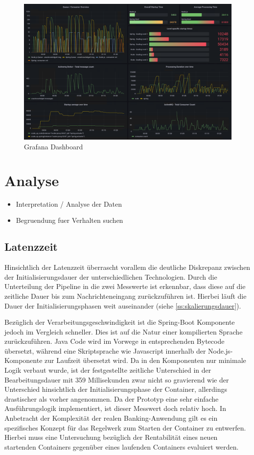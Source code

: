 \begin{figure}[ht!]
	\centering
	\includegraphics[width=\linewidth]{kapitel/problemloesung/implementierung/_img/grafana-dashboard-01}
	\caption[]{Grafana Dashboard}
	\label{fig:grafanaScreenshot01}
\end{figure}


\section{Analyse}
\begin{itemize}
  \item Interpretation / Analyse der Daten
  \item Begruendung fuer Verhalten suchen
\end{itemize}

\subsection{Latenzzeit}
Hinsichtlich der Latenzzeit überrascht vorallem die deutliche Diskrepanz zwischen der Initialisierungsdauer der unterschiedlichen Technologien. Durch die Unterteilung der Pipeline in die zwei Messwerte ist erkennbar, dass diese auf die zeitliche Dauer bis zum Nachrichteneingang zurückzuführen ist. Hierbei läuft die Dauer der Initialisierungsphasen weit auseinander (siehe \ref{ss:skalierungsdauer}).

Bezüglich der Verarbeitungsgeschwindigkeit ist die Spring-Boot Komponente jedoch im Vergleich schneller. Dies ist auf die Natur einer kompilierten Sprache zurückzuführen. Java Code wird im Vorwege in entsprechenden Bytecode übersetzt, während eine Skriptsprache wie Javascript innerhalb der Node.js-Komponente zur Laufzeit übersetzt wird. Da in den Komponenten nur minimale Logik verbaut wurde, ist der festgestellte zeitliche Unterschied in der Bearbeitungsdauer mit 359  Millisekunden zwar nicht so gravierend wie der Unterschied hinsichtlich der Initialisierungsphase der Container, allerdings drastischer als vorher angenommen. Da der Prototyp eine sehr einfache Ausführungslogik implementiert, ist dieser Messwert doch relativ hoch. In Anbetracht der Komplexität der realen Banking-Anwendung gilt es ein spezifisches Konzept für das Regelwerk zum Starten der Container zu entwerfen. Hierbei muss eine Untersuchung bezüglich der Rentabilität eines neuen startenden Containers gegenüber eines laufenden Containers evaluiert werden.


